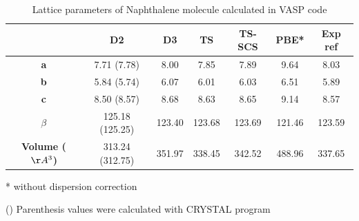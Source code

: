  	
 	\begin{table}[H]
 		\caption{Lattice parameters of Naphthalene molecule calculated in VASP code} \label{table-Naphsol}
 		\begin{center}
 			\begin{threeparttable}
 			\begin{tabular}{c c c c c c c}
 				\toprule
 				& \textbf{D2} & \textbf{D3} & \textbf{TS} & \textbf{TS-SCS} & \textbf{PBE*} & \textbf{Exp} ref\cite{fabbiani2006exploration} \\
 				\midrule
 				\textbf{a} &7.71 (7.78) & 8.00 & 7.85 & 7.89 & 9.64 & 8.03\\
 				\textbf{b}& 5.84 (5.74) & 6.07 & 6.01 & 6.03 & 6.51 & 5.89 \\
 				\textbf{c}& 8.50 (8.57) & 8.68 & 8.63 & 8.65 & 9.14 & 8.57 \\
 				\textbf{$\beta$} & 125.18 (125.25) & 123.40 & 123.68 & 123.69 & 121.46 & 123.59\\
 				\textbf{Volume ($\AA^{3}$)} & 313.24 (312.75) & 351.97 & 338.45 & 342.52 & 488.96 & 337.65\\
 				\bottomrule
 			\end{tabular}
 			
 			\begin{tablenotes}
 				\item[*] without dispersion correction
 				\item[()] Parenthesis values were calculated with CRYSTAL program
 			\end{tablenotes}
 		\end{threeparttable}
 		\end{center}
 	\end{table}
 


